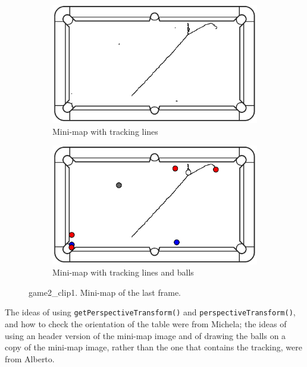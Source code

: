 \begin{figure}[H]
	\centering
	\begin{subfigure}[b]{0.48\textwidth}
		\centering
		\includegraphics[width=\textwidth]{images/Minimap/g2_c1minimap_with_track.jpg}
		\caption{Mini-map with tracking lines}
		\label{fig:game2_clip1_tracking}
	\end{subfigure}
	\begin{subfigure}[b]{0.48\textwidth}
		\centering
		\includegraphics[width=\textwidth]{images/Minimap/g2_c1_minimap_with_balls.jpg}
		\caption{Mini-map with tracking lines and balls}
		\label{fig:game2_clip1_balls}
	\end{subfigure}
	\caption{game2\_clip1. Mini-map of the last frame.}
	\label{fig:game2_clip1_balls_and_tracking}
\end{figure}

The ideas of using \texttt{getPerspectiveTransform()} and \texttt{perspectiveTransform()}, and how to check the orientation of the table were from Michela; the ideas of using an header version of the mini-map image and of drawing the balls on a copy of the mini-map image, rather than the one that contains the tracking, were from Alberto.

